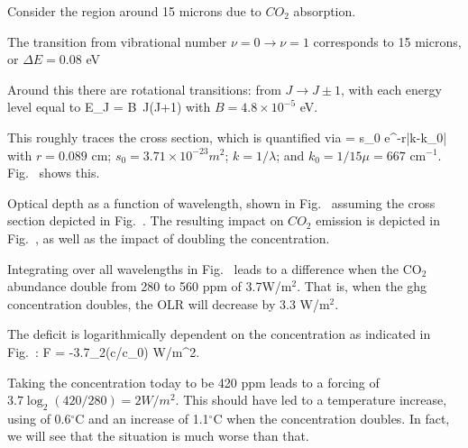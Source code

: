 \documentclass[11pt]{book}
\begin{document}
Consider the region around 15 microns due to $CO_2$ absorption.
\bee
\item The transition from vibrational number $\nu=0\rightarrow \nu=1$ corresponds to 15 microns, or $\Delta E = 0.08$ eV
\item Around this there are rotational transitions: from $J\rightarrow J\pm 1$, with each energy level equal to 
\be
E_J = B\, J(J+1)
\ee
with $B=4.8\times 10^{-5}$ eV.
\item This roughly traces the cross section, which is quantified via
\be
\sigma = s_0 e^{-r|k-k_0|}
\ee
with $r=0.089$ cm; $s_0=3.71\times 10^{-23}m^2$;  $k=1/\lambda$; and $k_0=1/15 \mu=667$ cm$^{-1}$. Fig.~ shows this.
\item Optical depth as a function of wavelength, shown in Fig.~ assuming the cross section depicted in Fig.~. 
The resulting impact on $CO_2$ emission is depicted in Fig.~, as well as the impact of doubling the concentration.
\item Integrating over all wavelengths in Fig.~ leads to a difference when the CO$_2$ abundance double from 280 to 560 ppm of 3.7W/m$^2$. That is, when the ghg concentration doubles, the OLR will decrease by 3.3 W/m$^2$. 
\item The deficit is logarithmically dependent on the concentration as indicated in Fig.~:
\be
\Delta F = -3.7\log_2(c/c_0) W/m^2.\ee 
{}
\item Taking the concentration today to be 420 ppm leads to a forcing of $3.7\log_2(420/280)=2 W/m^2$. This should have led to a temperature increase, using  of 0.6$^\circ$C and an increase of 1.1$^\circ$C when the concentration doubles. In fact, we will see that the situation is much worse than that.
\end{document}
